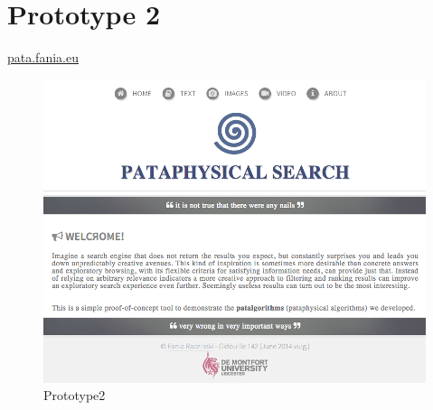 \section{Prototype 2}

{\Huge \url{pata.fania.eu}}

\begin{figure}[htb] %
  \centering
  \includegraphics[width=\linewidth]{images/prototype02}
\caption[Prototype2]{Prototype2}
\label{fig:Prototype2x}
\end{figure}

